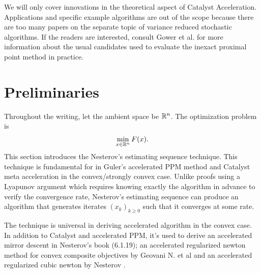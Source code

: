 \documentclass[12pt]{article}
\begin{document}
        We will only cover innovations in the theoretical aspect of Catalyst Acceleration. 
        Applications and specific example algorithms are out of the scope because there are too many papers on the separate topic of variance reduced stochastic algorithms. 
        If the readers are interested, consult Gower et al. \cite{gower_variance-reduced_2020} for more information about the usual candidates used to evaluate the inexact proximal point method in practice. 

\section{Preliminaries}\label{sec:preliminaries}
    Throughout the writing, let the ambient space be $\mathbb R^n$. 
    The optimization problem is
    \begin{align*}
        \min_{x \in \mathbb R^n} F(x). 
    \end{align*}
    This section introduces the Nesterov's estimating sequence technique. 
    This technique is fundamental for in Guler's accelerated PPM method and Catalyst meta acceleration in the convex/strongly convex case. 
    Unlike proofs using a Lyapunov argument which requires knowing exactly the algorithm in advance to verify the convergence rate, Nesterov's estimating sequence can produce an algorithm that generates iterates $(x_k)_{k \ge0}$ such that it converges at some rate. 
    \par
    The technique is universal in deriving accelerated algorithm in the convex case. 
    In addition to Catalyst and accelerated PPM, it's used to derive an accelerated mirror descent in Nesterov's book \cite{nesterov_lectures_2018} (6.1.19); an accelerated regularized newton method for convex composite objectives by Geovani N. et al \cite{grapiglia_accelerated_2019} and an accelerated regularized cubic newton by Nesterov \cite{nesterov_accelerating_2008}. 
\end{document}
